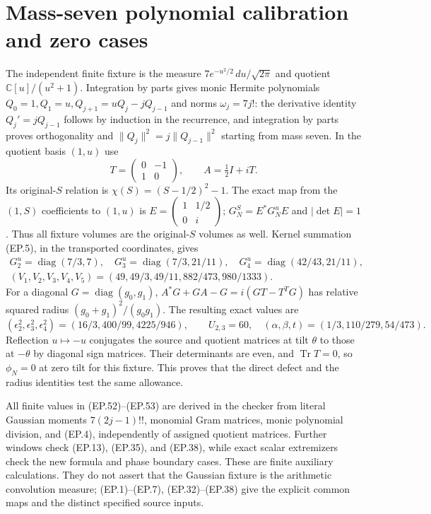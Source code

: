 \documentclass[11pt]{article}
\newcommand{\C}{\mathbb C}\newcommand{\R}{\mathbb R}
\newcommand{\Tr}{\operatorname{Tr}}\newcommand{\diag}{\operatorname{diag}}
\begin{document}
\section{Mass-seven polynomial calibration and zero cases}
The independent finite fixture is the measure
$7e^{-u^2/2}\,du/\sqrt{2\pi}$ and quotient $\C[u]/(u^2+1)$.
Integration by parts gives monic Hermite polynomials
$Q_0=1,Q_1=u,Q_{j+1}=uQ_j-jQ_{j-1}$ and norms $\omega_j=7j!$:
the derivative identity $Q_j'=jQ_{j-1}$ follows by induction in
the recurrence, and integration by parts proves orthogonality and
$\|Q_j\|^2=j\|Q_{j-1}\|^2$ starting from mass seven.
In the quotient basis $(1,u)$ use
\[
 T=\begin{pmatrix}0&-1\\1&0\end{pmatrix},\qquad A=\tfrac12I+iT.
 \tag{EP.51}
\]
Its original-$S$ relation is $\chi(S)=(S-1/2)^2-1$.
The exact map from the $(1,S)$ coefficients to $(1,u)$ is
$E=\left(\begin{smallmatrix}1&1/2\\0&i\end{smallmatrix}\right)$;
$G_N^S=E^*G_N^uE$ and $|\det E|=1$.
Thus all fixture volumes are the original-$S$ volumes as well.
Kernel summation (EP.5), in the transported coordinates, gives
\[
 \begin{gathered}
 G_2^u=\diag(7/3,7),\quad
 G_3^u=\diag(7/3,21/11),\quad
 G_4^u=\diag(42/43,21/11),\\
 (V_1,V_2,V_3,V_4,V_5)
 =(49,49/3,49/11,882/473,980/1333).
 \end{gathered}\tag{EP.52}
\]
For a diagonal $G=\diag(g_0,g_1)$,
$A^*G+GA-G=i(GT-T^TG)$ has relative squared radius
$(g_0+g_1)^2/(g_0g_1)$. The resulting exact values are
\[
 (\epsilon_2^2,\epsilon_3^2,\epsilon_4^2)
 =(16/3,400/99,4225/946),\qquad
 U_{2,3}=60,\quad(\alpha,\beta,t)=(1/3,110/279,54/473).
 \tag{EP.53}
\]
Reflection $u\mapsto-u$ conjugates the source and quotient matrices
at tilt $\theta$ to those at $-\theta$ by diagonal sign matrices.
Their determinants are even, and $\Tr T=0$, so $\phi_N=0$ at
zero tilt for this fixture. This proves that the direct defect and
the radius identities test the same allowance.

All finite values in (EP.52)--(EP.53) are derived in the checker
from literal Gaussian moments $7(2j-1)!!$, monomial Gram matrices,
monic polynomial division, and (EP.4), independently of assigned
quotient matrices. Further windows check (EP.13), (EP.35), and
(EP.38), while exact scalar extremizers check the new formula and
phase boundary cases. These are finite auxiliary calculations.
They do not assert that the Gaussian fixture is the arithmetic
convolution measure; (EP.1)--(EP.7), (EP.32)--(EP.38) give the
explicit common maps and the distinct specified source inputs.
\end{document}
